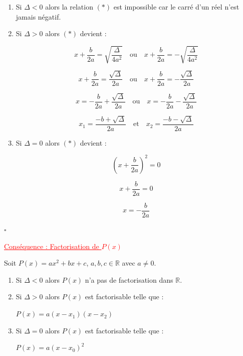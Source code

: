 \documentclass[12pt,a4paper]{article}
\begin{document}
\begin{enumerate}

\item[(i)] Si $\Delta<0$ alors la relation $(*)$ est impossible car le carré d’un réel n’est jamais négatif.

\medskip

\item[(ii)] Si $\Delta>0$ alors $(*)$ devient :

\[
x+\frac{b}{2a}
=
\sqrt{\frac{\Delta}{4a^2}}
\quad \text{ou} \quad
x+\frac{b}{2a}
=
-\sqrt{\frac{\Delta}{4a^2}}
\]

\[
x+\frac{b}{2a}
=
\frac{\sqrt{\Delta}}{2a}
\quad \text{ou} \quad
x+\frac{b}{2a}
=
-\frac{\sqrt{\Delta}}{2a}
\]

\[
x
=
-\frac{b}{2a}
+
\frac{\sqrt{\Delta}}{2a}
\quad \text{ou} \quad
x
=
-\frac{b}{2a}
-
\frac{\sqrt{\Delta}}{2a}
\]

\[
x_1=\frac{-b+\sqrt{\Delta}}{2a}
\quad \text{et} \quad
x_2=\frac{-b-\sqrt{\Delta}}{2a}
\]

\medskip

\item[(iii)] Si $\Delta=0$ alors $(*)$ devient :

\[
\left(x+\frac{b}{2a}\right)^2=0
\]

\[
x+\frac{b}{2a}=0
\]

\[
x=-\frac{b}{2a}
\]

\end{enumerate}

\hfill $\square$

\noindent
\textcolor{red}{\underline{Conséquence : Factorisation de $P(x)$}}

\medskip

Soit $P(x)=ax^2+bx+c$, $a,b,c\in\mathbb{R}$ avec $a\neq0$.

\begin{enumerate}
\item[(i)] Si $\Delta<0$ alors $P(x)$ n’a pas de factorisation dans $\mathbb{R}$.

\item[(ii)] Si $\Delta>0$ alors $P(x)$ est factorisable telle que :

\(
\boxed{P(x)=a(x-x_1)(x-x_2)}
\)

\item[(iii)] Si $\Delta=0$ alors $P(x)$ est factorisable telle que :

\(
\boxed{P(x)=a(x-x_0)^2}
\)
\end{enumerate}
\end{document}
